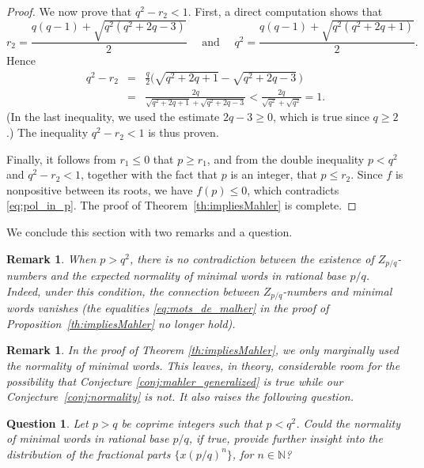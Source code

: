 \documentclass{template_arxiv}
\newtheorem{question}[theorem]{Question}
\newtheorem{remark}[theorem]{Remark}
\numberwithin{equation}{section}
\newcommand{\N}{\mathbb N}
\newcommand{\ds}{\displaystyle}
\begin{document}
\begin{proof}
We now prove that $q^2-r_2<1$. First, a direct computation shows that
\[
r_2=\frac{q(q-1)+\sqrt{q^2(q^2+2q-3)}}{2} \quad\text{ and }\quad q^2 = \frac{q(q-1)+\sqrt{q^2(q^2+2q+1)}}{2}.
\]
Hence
\[
	\begin{array}{rcl}
		q^2-r_2 &=& \ds\frac{q}{2}\big(\sqrt{q^2+2q+1} - \sqrt{q^2+2q-3}\,\big)\\
		&=& \ds\frac{2q}{\sqrt{q^2+2q+1} + \sqrt{q^2+2q-3}} < \frac{2q}{\sqrt{q^2}+\sqrt{q^2}} =1.
	\end{array}
\]
(In the last inequality, we used the estimate $2q-3\geq 0$, which is true since $q\geq2$.) The inequality $q^2-r_2<1$ is thus proven.

Finally, it follows from $r_1\leq 0$ that $ p \geq r_1 $, and from the double inequality $p<q^2$ and $q^2-r_2<1$, together with the fact that $p$ is an integer, that $ p\leq r_2$. Since 
$f$ is nonpositive between its roots, we have $f(p)\leq 0$, which contradicts \eqref{eq:pol_in_p}. The proof of Theorem~\ref{th:impliesMahler} is complete.
\end{proof}



We conclude this section with two remarks and a question.


\begin{remark} When $p>q^2$, there is no contradiction between the existence of $Z_{p/q}$-numbers and the expected normality of minimal words in rational base $p/q$. Indeed, under this condition, 
	the connection between $Z_{p/q}$-numbers and minimal words vanishes (the equalities \eqref{eq:mots_de_malher} in the proof of Proposition~\ref{th:impliesMahler} no longer hold). 
\end{remark}

\begin{remark} In the proof of Theorem \ref{th:impliesMahler}, we only marginally used the normality of minimal words. This leaves, in theory, considerable room for the possibility that Conjecture \ref{conj:mahler_generalized} is true while our Conjecture~\ref{conj:normality} is not. It also raises the following question.
\end{remark}


\begin{question}\label{question:further_mahler}
	Let $p>q$ be coprime integers such that $p<q^2$. Could the normality of minimal words in rational base $p/q$, if true, provide further insight into the distribution of the fractional parts $\{x(p/q)^n\}$, for $n \in \N$?  
\end{question}
\end{document}

